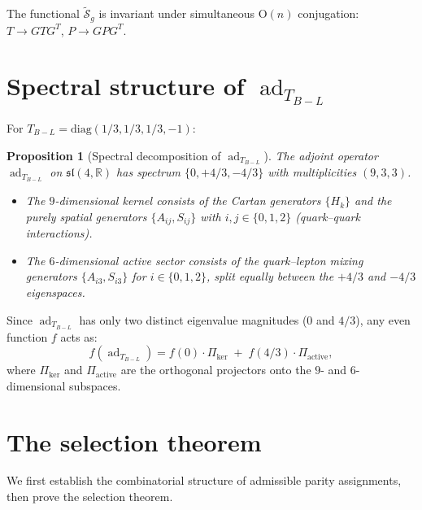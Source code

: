 \documentclass[11pt]{article}
\theoremstyle{plain}
\newtheorem{proposition}[theorem]{Proposition}
\theoremstyle{definition}
\theoremstyle{remark}
\newcommand{\sln}[1]{\mathfrak{sl}(#1,\mathbb{R})}
\newcommand{\TBL}{T_{B\!-\!L}}
\newcommand{\ad}{\operatorname{ad}}
\begin{document}
The functional $\widetilde{\mathcal{S}}_g$ is invariant under
simultaneous $\mathrm{O}(n)$ conjugation:
$T \to GTG^T$, $P \to GPG^T$.

\section{Spectral structure of $\ad_{\TBL}$}

For $\TBL = \mathrm{diag}(1/3, 1/3, 1/3, -1)$:

\begin{proposition}[Spectral decomposition of $\ad_{\TBL}$]
\label{prop:spectrum}
The adjoint operator $\ad_{\TBL}$ on $\sln{4}$ has spectrum
$\{0, +4/3, -4/3\}$ with multiplicities $(9, 3, 3)$.
\begin{itemize}\itemsep0pt
  \item The $9$-dimensional kernel consists of the Cartan
    generators $\{H_k\}$ and the purely spatial generators
    $\{A_{ij}, S_{ij}\}$ with $i, j \in \{0,1,2\}$ (quark--quark
    interactions).
  \item The $6$-dimensional active sector consists of the
    quark--lepton mixing generators $\{A_{i3}, S_{i3}\}$ for
    $i \in \{0,1,2\}$, split equally between the $+4/3$ and
    $-4/3$ eigenspaces.
\end{itemize}
\end{proposition}

Since $\ad_{\TBL}$ has only two distinct eigenvalue magnitudes ($0$
and $4/3$), any even function $f$ acts as:
\begin{equation}\label{eq:f-spectral}
  f(\ad_{\TBL}) = f(0) \cdot \Pi_{\ker}
  \;+\; f(4/3) \cdot \Pi_{\mathrm{active}},
\end{equation}
where $\Pi_{\ker}$ and $\Pi_{\mathrm{active}}$ are the orthogonal
projectors onto the $9$- and $6$-dimensional subspaces.

\section{The selection theorem}

We first establish the combinatorial structure of admissible
parity assignments, then prove the selection theorem.
\end{document}

